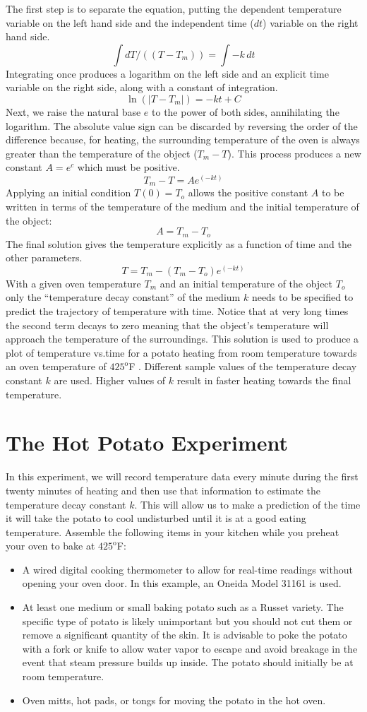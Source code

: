 \documentclass{ximera}
\begin{document}
The first step is to separate the equation, putting the dependent temperature variable on the left hand side and the independent time ($dt$) variable on the right hand side.
\[
\int dT/((T-T_m))=\int-k\,dt
\]
Integrating once produces a logarithm on the left side and an explicit time variable on the right side, along with a constant of integration.
\[
\ln(|T-T_m |)=-kt+C
\]
Next, we raise the natural base $e$ to the power of both sides, annihilating the logarithm.  The absolute value sign can be discarded by reversing the order of the difference because, for heating, the surrounding temperature of the oven is always greater than the temperature of the object ($T_m-T$).  This process produces a new constant $A=e^c$ which must be positive.
\[
T_m-T=Ae^(-kt)
\]
Applying an initial condition $T(0)=T_o$ allows the positive constant $A$ to be written in terms of the temperature of the medium and the initial temperature of the object:
\[
A=T_m-T_o
\]
The final solution gives the temperature explicitly as a function of time and the other parameters.
\[
T=T_m-(T_m-T_o ) e^(-kt)
\]
With a given oven temperature $T_m$ and an initial temperature of the object $T_o$ only the ``temperature decay constant'' of the medium $k$ needs to be specified to predict the trajectory of temperature with time.  Notice that at very long times the second term decays to zero meaning that the object's temperature will approach the temperature of the surroundings.
This solution is used to produce a plot of temperature vs.time for a potato heating from room temperature towards an oven temperature of $425^{\text{o}}$F .  Different sample values of the temperature decay constant $k$ are used.  Higher values of $k$ result in faster heating towards the final temperature.
 
\section*{The Hot Potato Experiment}
In this experiment, we will record temperature data every minute during the first twenty minutes of heating and then use that information to estimate the temperature decay constant $k$.  This will allow us to make a prediction of the time it will take the potato to cool undisturbed until it is at a good eating temperature.
Assemble the following items in your kitchen while you preheat your oven to bake at $425^{\text{o}}$F:

\begin{itemize}
\item A wired digital cooking thermometer to allow for real-time readings without opening your oven door. In this example, an Oneida Model 31161 is used.
\item At least one medium or small baking potato such as a Russet variety. The specific type of potato is likely unimportant but you should not cut them or remove a significant quantity of the skin.  It is advisable to poke the potato with a fork or knife to allow water vapor to escape and avoid breakage in the event that steam pressure builds up inside.  The potato should initially be at room temperature.
\item Oven mitts, hot pads, or tongs for moving the potato in the hot oven.
\end{itemize}
\end{document}
